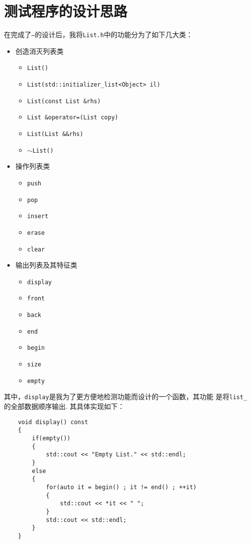 \documentclass[UTF8]{ctexart}
\begin{document}
\pagestyle{fancy}
\fancyhead{}
\rhead{\today}

\section{测试程序的设计思路}
在完成了\texttt{--}的设计后，我将\texttt{List.h}中的功能分为了如下几大类：\par
\begin{itemize}
    \item 创造消灭列表类\begin{itemize}
        \item \texttt{List()}
        \item \texttt{List(std::initializer\_list<Object> il)}
        \item \texttt{List(const List \&rhs)}
        \item \texttt{List \&operator=(List copy)}
        \item \texttt{List(List \&\&rhs)}
        \item \texttt{$\sim$List()}
    \end{itemize}
    \item 操作列表类\begin{itemize}
        \item \texttt{push}
        \item \texttt{pop}
        \item \texttt{insert}
        \item \texttt{erase}
        \item \texttt{clear}
    \end{itemize}
    \item 输出列表及其特征类\begin{itemize}
        \item \texttt{display}
        \item \texttt{front}
        \item \texttt{back}
        \item \texttt{end}
        \item \texttt{begin}
        \item \texttt{size}
        \item \texttt{empty}
    \end{itemize}
\end{itemize}
其中，\texttt{display}是我为了更方便地检测功能而设计的一个函数，其功能
是将\texttt{list\_}的全部数据顺序输出.
其具体实现如下：\begin{lstlisting}
    void display() const
    {
        if(empty())
        {
            std::cout << "Empty List." << std::endl;
        }
        else
        {
            for(auto it = begin() ; it != end() ; ++it)
            {
                std::cout << *it << " ";
            }
            std::cout << std::endl;
        }
    }
\end{lstlisting}
\end{document}

